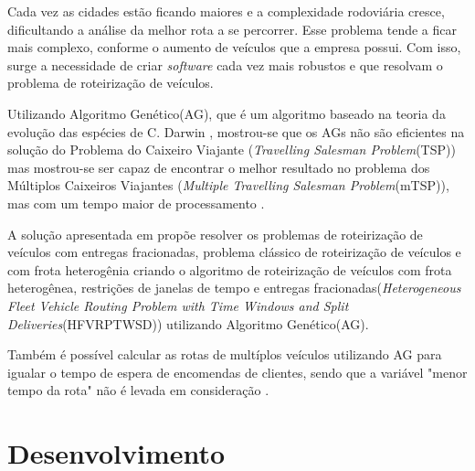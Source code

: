 \documentclass[final,5p,times,twocolumn]{elsarticle}
\begin{document}
	Cada vez as cidades estão ficando maiores e a complexidade rodoviária cresce, dificultando a
	análise da melhor rota a se percorrer. Esse problema tende a ficar mais complexo, conforme o aumento de
	veículos que a empresa possui. Com isso, surge a necessidade de criar \textit{software} cada vez mais robustos e que resolvam o problema de roteirização de veículos.

	Utilizando Algoritmo Genético(AG), que é um algoritmo baseado na teoria da evolução das espécies de C. Darwin \cite{0004-pdf}, mostrou-se  que os AGs não são eficientes na solução do Problema do Caixeiro Viajante (\textit{Travelling Salesman Problem}(TSP)) mas mostrou-se ser capaz de encontrar o melhor resultado no problema dos Múltiplos Caixeiros Viajantes (\textit{Multiple Travelling Salesman Problem}(mTSP)), mas com um tempo maior de processamento \cite{0005-pdf}. 	

	A solução apresentada em \cite{0006-pdf} propõe resolver os problemas de roteirização de veículos com entregas fracionadas, problema clássico de roteirização de veículos e com frota heterogênia criando o algoritmo de roteirização de veículos com frota
heterogênea, restrições de janelas de tempo e entregas fracionadas(\textit{Heterogeneous Fleet Vehicle Routing Problem with Time Windows and Split Deliveries}(HFVRPTWSD)) utilizando Algoritmo Genético(AG).

	Também é possível calcular as rotas de multíplos veículos utilizando AG para igualar o tempo de espera de encomendas de clientes, sendo que a variável "menor tempo da rota" não é levada em consideração \cite{0005-pdf}.
	
	
	


\section{Desenvolvimento}
\end{document}
